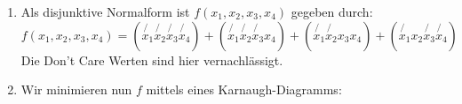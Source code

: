 \begin{enumerate}[label={[OH\arabic*]},start=1]
\begin{enumerate}
\begin{center}
\begin{tabular}{lllllr}
                        $6$ & $0$ & $1$ & $1$ & $0$ & $0$ \\
                        $7$ & $0$ & $1$ & $1$ & $1$ & $0$ \\
                        $8$ & $1$ & $0$ & $0$ & $0$ & $0$ \\
                        $9$ & $1$ & $0$ & $0$ & $1$ & $0$ \\
                        $10$ & $1$ & $0$ & $1$ & $0$ & $D$ \\
                        $11$ & $1$ & $0$ & $1$ & $1$ & $D$ \\
                        $12$ & $1$ & $1$ & $0$ & $0$ & $D$ \\
                        $13$ & $1$ & $1$ & $0$ & $1$ & $D$ \\
                        $14$ & $1$ & $1$ & $1$ & $0$ & $D$ \\
                        $15$ & $1$ & $1$ & $1$ & $1$ & $D$ \\
                        \bottomrule
                    \end{tabular}
                \end{center}
            \item Als disjunktive Normalform ist $f(x_1, x_2, x_3, x_4)$ gegeben durch:
                \begin{equation*}
                    f(x_1, x_2, x_3, x_4)
                         = (\not{x_1}\not{x_2}\not{x_3}\not{x_4}) +
                           (\not{x_1}\not{x_2}\not{x_3}    {x_4}) +
                           (\not{x_1}\not{x_2}    {x_3}    {x_4}) +
                           (\not{x_1}    {x_2}\not{x_3}\not{x_4})  
                \end{equation*}
                Die Don't Care Werten sind hier vernachlässigt. 
            \item Wir minimieren nun $f$ mittels eines Karnaugh-Diagramms:
                \begin{center}
\end{center}
\end{enumerate}
\end{enumerate}
